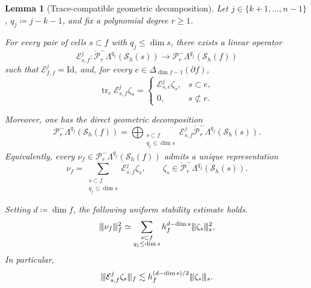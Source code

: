 \documentclass[10pt,a4paper]{amsart}
\newtheorem{lemma}{Lemma}
\newcommand{\FM}[1]{\Delta_{#1}}
\newcommand{\PLtrim}[2]{\mathcal{P}_{#1}^{-}\Lambda^{#2}}
\newcommand{\PLtrimz}[2]{\mathring{\mathcal P}_{#1}^{-}\Lambda^{#2}}
\newcommand{\Sh}{\mathcal{S}_h}
\newcommand{\trc}{\operatorname{tr}}
\newcommand{\vvvert}{\vert\kern-0.25ex\vert\kern-0.25ex\vert}
\begin{document}
\begin{lemma}[Trace-compatible geometric decomposition]
\label{lem:geometric.extensions}
Let $j\in\{k+1,\ldots,n-1\}$, $q_j\coloneqq j-k-1$, and fix a polynomial degree $r\geq 1$.

For every pair of cells $s\subset f$ with $q_j\leq\dim s$, there exists a linear operator
\[
  \mathcal E_{s,f}^j\colon
  \PLtrimz{r}{q_j}(\Sh(s))
  \longrightarrow
  \PLtrim{r}{q_j}(\Sh(f))
\]
such that $\mathcal E_{f,f}^j=\mathrm{Id}$, and, for every $e\in\FM{\dim f-1}(\partial f)$,
\begin{equation}\label{eq:geometric.extension.trace}
  \trc_e
  \mathcal E_{s,f}^j\zeta_s
  =
  \begin{cases}
    \mathcal E_{s,e}^j\zeta_s,
    &s\subset e,
    \\[1mm]
    0,
    &s\not\subset e.
  \end{cases}
\end{equation}

Moreover, one has the direct geometric decomposition
\begin{equation}\label{eq:geometric.direct.sum}
\PLtrim{r}{q_j}(\Sh(f))
=\bigoplus_{\substack{
s\subset f\\
q_j\leq\dim s
}}
\mathcal E_{s,f}^j
\PLtrimz{r}{q_j}(\Sh(s)).
\end{equation}
Equivalently, every $\nu_f\in\PLtrim{r}{q_j}(\Sh(f))$ admits a unique representation
\[
  \nu_f
  =
  \sum_{\substack{
    s\subset f\\
    q_j\leq\dim s
  }}
  \mathcal E_{s,f}^j\zeta_s,
  \qquad
  \zeta_s\in
  \PLtrimz{r}{q_j}(\Sh(s)).
\]

Setting $d\coloneqq\dim f$, the following uniform stability estimate holds.
\begin{equation}\label{eq:geometric.norm.equivalence}
  \vvvert\nu_f\vvvert_f^2
  \simeq
  \sum_{\substack{
    s\subset f\\
    q_j\leq\dim s
  }}
  h_f^{d-\dim s}
  \vvvert\zeta_s\vvvert_s^2,
\end{equation}
In particular,
\begin{equation}\label{eq:geometric.extension.stability}
  \vvvert
  \mathcal E_{s,f}^j\zeta_s
  \vvvert_f
  \lesssim
  h_f^{(d-\dim s)/2}
  \vvvert\zeta_s\vvvert_s.
\end{equation}
\end{lemma}
\end{document}
